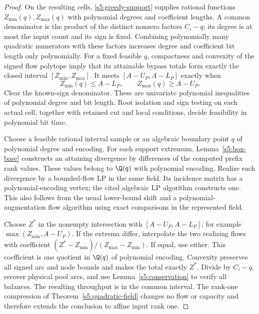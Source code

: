 \begin{proof}
On the resulting cells, \eqref{s5:greedy-support} supplies rational
functions $Z_{\min}(q),Z_{\max}(q)$ with polynomial degrees and
coefficient lengths. A common denominator is the product of the
distinct nonzero factors $C_i-q$; its degree is at most the input count
and its sign is fixed. Combining polynomially many quadratic numerators
with these factors increases degree and coefficient bit length only polynomially.
For a fixed feasible $q$, compactness and convexity of the signed flow
polytope imply that its attainable bypass totals form exactly the closed
interval $[Z_{\min},Z_{\max}]$. It meets $[A-U_P,A-L_P]$ exactly when
\begin{equation}
 Z_{\min}(q)\le A-L_P,\qquad Z_{\max}(q)\ge A-U_P.
 \label{s5:capacity-test}
\end{equation}
Clear the known-sign denominator. These are univariate polynomial
inequalities of polynomial degree and bit length. Root isolation and
sign testing on each actual cell, together with retained cut and local
conditions, decide feasibility in polynomial bit time.

Choose a feasible rational interval sample or an algebraic boundary
point $q$ of polynomial degree and encoding. For each support extremum,
Lemma~\ref{s5:box-base} constructs an attaining divergence by differences
of the computed prefix rank values. These values belong to $\Q(q)$
with polynomial encoding. Realize each divergence by a bounded-flow LP
in the same field. Its incidence matrix has a polynomial-encoding
vertex; the cited algebraic LP algorithm constructs one. This also
follows from the usual lower-bound shift and a polynomial-augmentation
flow algorithm using exact comparisons in the represented field.

Choose $Z^*$ in the nonempty intersection with $[A-U_P,A-L_P]$, for
example $\max(Z_{\min},A-U_P)$. If the extrema differ, interpolate the
two realizing flows with coefficient
$(Z^*-Z_{\min})/(Z_{\max}-Z_{\min})$. If equal, use either. This
coefficient is one quotient in $\Q(q)$ of polynomial encoding.
Convexity preserves all signed arc and node bounds and makes the total
exactly $Z^*$. Divide by $C_i-q$, recover physical pool arcs, and use
Lemma~\ref{s5:conservation} to verify all balances. The resulting
throughput is in the common interval. The rank-one compression of
Theorem~\ref{s5:quadratic-field} changes no flow or capacity and therefore
extends the conclusion to affine input rank one.
\end{proof}

